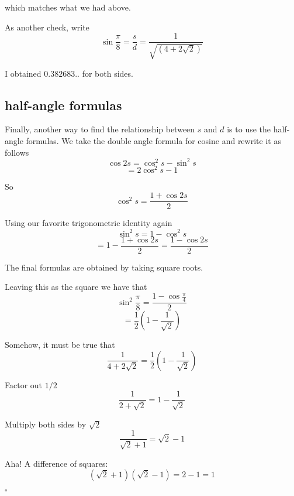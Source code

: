 \documentclass[11pt, oneside]{article}
\begin{document}
which matches what we had above.

As another check, write
\[ \sin \frac{\pi}{8} = \frac{s}{d} = \frac{1}{\sqrt{(4 + 2 \sqrt{2})}} \]

I obtained $0.382683..$ for both sides.

\subsection*{half-angle formulas}

Finally, another way to find the relationship between $s$ and $d$ is to use the half-angle formulas.  We take the double angle formula for cosine and rewrite it as follows
\[ \cos 2s = \cos^2 s - \sin^2 s \]
\[ = 2 \cos^2 s - 1 \]

So
\[ \cos^2 s = \frac{1 + \cos 2s}{2} \]

Using our favorite trigonometric identity again
\[ \sin^2 s = 1 - \cos^2 s \]
\[ = 1 - \frac{1 + \cos 2s}{2} =  \frac{1 - \cos 2s}{2} \]

The final formulas are obtained by taking square roots.  

Leaving this as the square we have that
\[ \sin^2 \frac{\pi}{8} = \frac{1 - \cos \frac{\pi}{4}}{2} \]
\[ = \frac{1}{2} (1 - \frac{1}{\sqrt{2}}) \]

Somehow, it must be true that
\[ \frac{1}{4 + 2 \sqrt{2}} = \frac{1}{2} (1 - \frac{1}{\sqrt{2}}) \]

Factor out $1/2$
\[ \frac{1}{2 + \sqrt{2}} = 1 - \frac{1}{\sqrt{2}} \]

Multiply both sides by $\sqrt{2}$
\[ \frac{1}{\sqrt{2} + 1} = \sqrt{2} - 1 \]

Aha!  A difference of squares:
\[ (\sqrt{2} + 1)(\sqrt{2} - 1) = 2 - 1 = 1  \]

$\square$
\end{document}
